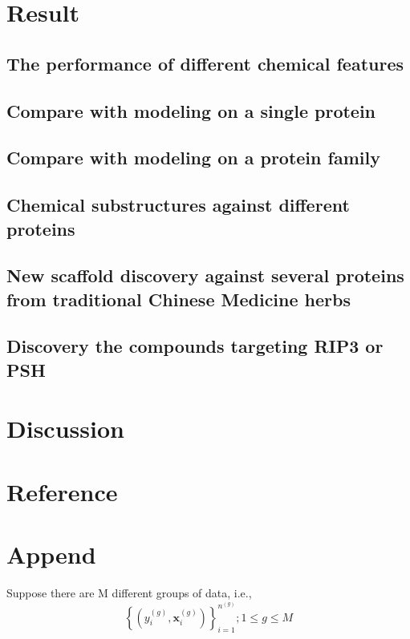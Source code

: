 \documentclass[paper=a4, fontsize=11pt]{scrartcl}
\numberwithin{equation}{section}		%
\numberwithin{figure}{section}			%
\numberwithin{table}{section}				%
\begin{document}
\section{Result}
\subsection{The performance of different chemical features}
\subsection{Compare with modeling on a single protein}
\subsection{Compare with modeling on a protein family}
\subsection{Chemical substructures against different proteins}
\subsection{New scaffold discovery against several proteins from traditional Chinese Medicine herbs}
\subsection{Discovery the compounds targeting RIP3 or PSH}
\section{Discussion}
\section*{Reference}
\newpage
\section{Append}
Suppose there are M different groups of data, i.e.,
\begin{displaymath}
\left\{(y_{i}^{(g)},\bm{x}_{i}^{(g)})\right\}_{i=1}^{n^{(g)}};
1\leq g \leq M
\end{displaymath}
\end{document}
